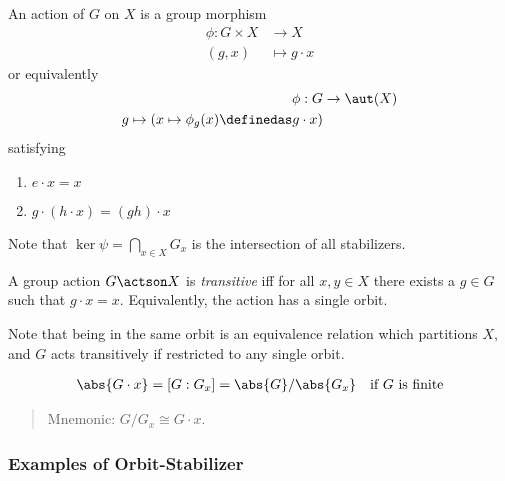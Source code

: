 \begin{definition}

An action of \(G\) on \(X\) is a group morphism \begin{align*}
\phi:G \times X &\rightarrow X \\ 
(g,x) &\mapsto g\cdot x
\end{align*} or equivalently \begin{align*}
\phi: G &\to \aut(X) \\
g \mapsto (x \mapsto \phi_g(x) \definedas g\cdot x)
\end{align*} satisfying

\begin{enumerate}
\def\labelenumi{\arabic{enumi}.}
\tightlist
\item
  \(e\cdot x = x\)
\item
  \(g\cdot (h\cdot x) = (gh)\cdot x\)
\end{enumerate}

\end{definition}

Note that \(\ker \psi = \bigcap_{x\in X} G_x\) is the intersection of
all stabilizers.

\begin{definition}[Transitive]

A group action \(G\actson X\) is \emph{transitive} iff for all
\(x, y\in X\) there exists a \(g\in G\) such that \(g\cdot x = x\).
Equivalently, the action has a single orbit.

\end{definition}

Note that being in the same orbit is an equivalence relation which
partitions \(X\), and \(G\) acts transitively if restricted to any
single orbit.

\begin{theorem}

\begin{align*}
\abs{G\cdot x} = [G: G_x] = \abs{G} / \abs{G_x}\quad \text{if $G$ is finite}
\end{align*}

\end{theorem}

\begin{quote}
Mnemonic: \(G/G_x \cong G\cdot x\).
\end{quote}

\hypertarget{examples-of-orbit-stabilizer}{%
\subsubsection{Examples of
Orbit-Stabilizer}\label{examples-of-orbit-stabilizer}}

